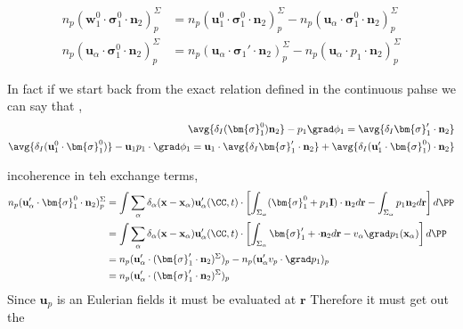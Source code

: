 \begin{align*}
    n_p (\textbf{w}_1^0 \cdot \bm{\sigma}_1^0 \cdot  \textbf{n}_2)^\Sigma_p
    &= 
    n_p (\textbf{u}_1^0 \cdot \bm{\sigma}_1^0 \cdot  \textbf{n}_2)^\Sigma_p
    - n_p (\textbf{u}_\alpha \cdot \bm{\sigma}_1^0 \cdot  \textbf{n}_2)^\Sigma_p\\
    n_p (\textbf{u}_\alpha \cdot \bm{\sigma}_1^0 \cdot  \textbf{n}_2)^\Sigma_p
    &=
    n_p (\textbf{u}_\alpha \cdot \bm{\sigma}_1' \cdot  \textbf{n}_2)^\Sigma_p
    - n_p (\textbf{u}_\alpha \cdot p_1 \cdot  \textbf{n}_2)^\Sigma_p
\end{align*}

In fact if we start back from the exact relation defined in the continuous pahse we can say that ,
\begin{align*}
    \avg{\delta_I (\bm{\sigma}_1^0 ) \textbf{n}_2} - p_1 \grad \phi_1
    = 
    \avg{\delta_I \bm{\sigma}_1'\cdot \textbf{n}_2}
    \\
    \avg{\delta_I (\textbf{u}_1^0 \cdot\bm{\sigma}_1^0 )} - \textbf{u}_1p_1\cdot \grad \phi_1
    = \textbf{u}_1 \cdot \avg{\delta_I \bm{\sigma}_1'\cdot \textbf{n}_2}
    + \avg{\delta_I (\textbf{u}_1' \cdot \bm{\sigma}_1^0 )\cdot \textbf{n}_2}
\end{align*}

incoherence in teh exchange terms, 
\begin{align*}
    n_p (\textbf{u}_\alpha' \cdot \bm{\sigma}_1^0\cdot \textbf{n}_2)^\Sigma_p
    &= \int
    \sum_\alpha \delta_\alpha(\textbf{x} - \textbf{x}_\alpha)
    \textbf{u}_\alpha'(\CC,t)\cdot
    \left[\int_{\Sigma_\alpha} 
     (\bm{\sigma}_1^0 +p_1 \textbf{I})\cdot \textbf{n}_2
     d\textbf{r}
    - \int_{\Sigma_\alpha} 
     p_1  \textbf{n}_2
     d\textbf{r}\right]
     d\PP \\
    &= \int
    \sum_\alpha \delta_\alpha(\textbf{x} - \textbf{x}_\alpha)
    \textbf{u}_\alpha'(\CC,t)\cdot
    \left[\int_{\Sigma_\alpha} 
     \bm{\sigma}_1' +\cdot \textbf{n}_2
     d\textbf{r}
    - v_\alpha \grad p_1(\textbf{x}_\alpha)
    \right]
     d\PP \\
    &= n_p (\textbf{u}_\alpha' \cdot (\bm{\sigma}'_1\cdot \textbf{n}_2)^\Sigma )_p
    -  n_p (\textbf{u}_\alpha' v_p \cdot \grad p_1 )_p
     \\
    &= n_p (\textbf{u}_\alpha' \cdot (\bm{\sigma}'_1\cdot \textbf{n}_2)^\Sigma )_p
     \\
\end{align*}
Since $\textbf{u}_p$ is an Eulerian fields it must be evaluated at $\textbf{r}$ Therefore it must get out the 

